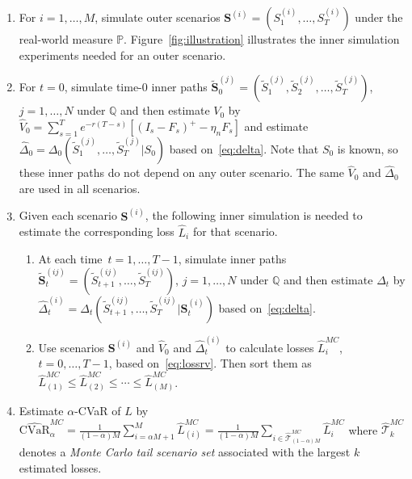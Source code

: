 \documentclass[]{article}
\newcommand{\CVaR}{\mbox{CVaR}}
\newcommand{\tail}{\mathcal{T}}
\newcommand{\bS}{\bm{S}}
\newcommand{\bStilde}{\widetilde{\bm{S}}}
\newcommand{\Stilde}{\widetilde{S}}
\newcommand{\Vhat}{\widehat{V}}
\newcommand{\Lhat}{\widehat{L}}
\newcommand{\Deltahat}{\widehat{\Delta}}
\begin{document}
\begin{enumerate}
    \item For $i=1,\ldots,M$, simulate outer scenarios $\bS^{(i)} = (S_{1}^{(i)},\ldots,S_{T}^{(i)})$ under the real-world measure $\mathbb{P}$.
    Figure~\ref{fig:illustration} illustrates the inner simulation experiments needed for an outer scenario.
    
    \item For $t=0$, simulate time-$0$ inner paths $\bStilde_{0}^{(j)} = (\Stilde_{1}^{(j)},\Stilde_{2}^{(j)},\ldots,\Stilde_{T}^{(j)})$, $j=1,\ldots,N$ under $\mathbb{Q}$ {and} then estimate $V_0$ by $\Vhat_0 = \sum_{s=1}^{T} e^{-r(T-s)} [(I_s - F_s)^+- \eta_n F_s]$ and estimate $\Deltahat_0 = \Delta_0(\Stilde_{1}^{(j)},\ldots,\Stilde_{T}^{(j)} | S_0)$ based on~\eqref{eq:delta}.
    Note that $S_0$ is known, so these inner paths do not depend on any outer scenario.
    The same $\Vhat_0$ and $\Deltahat_0$ are used in all scenarios.
    
    \item Given each scenario $\bS^{(i)}$, the following inner simulation is needed to estimate the corresponding loss $\Lhat_i$ for that scenario.
    \begin{enumerate}
        \item At each time~$t=1,\ldots,T-1$, simulate inner paths $\bStilde_{t}^{(ij)} = (\Stilde_{t+1}^{(ij)},\ldots,\Stilde_{T}^{(ij)})$, $j=1,\ldots,N$ under $\mathbb{Q}$ {and} then estimate $\Delta_t$ by $\Deltahat_t^{(i)} = \Delta_t(\Stilde_{t+1}^{(ij)},\ldots,\Stilde_{T}^{(ij)} | \bm{S}_t^{(i)})$ based on~\eqref{eq:delta}.

        \item Use scenarios $\bS^{(i)}$ and $\Vhat_0$ and $\Deltahat_t^{(i)}$ to calculate losses $\Lhat_i^{MC}$, $t=0,\ldots,T-1$, based on~\eqref{eq:lossrv}. Then sort them as $\Lhat^{MC}_{(1)}\leq \Lhat^{MC}_{(2)} \leq \cdots\leq \Lhat^{MC}_{(M)}$.
    \end{enumerate}

    \item Estimate $\alpha$-CVaR of $L$ by $\widehat{\CVaR}^{MC}_\alpha = \frac{1}{(1-\alpha)M} \sum_{i=\alpha M + 1}^{M}\Lhat_{(i)}^{MC} = \frac{1}{(1-\alpha)M} \sum_{i \in \widehat{\tail}_{(1-\alpha )M}^{MC}}\Lhat_{i}^{MC}$
where $\widehat{\tail}_{k}^{MC}$ denotes {a} \textit{Monte Carlo tail scenario set} associated with the largest $k$ estimated losses.
\end{enumerate}
\end{document}
